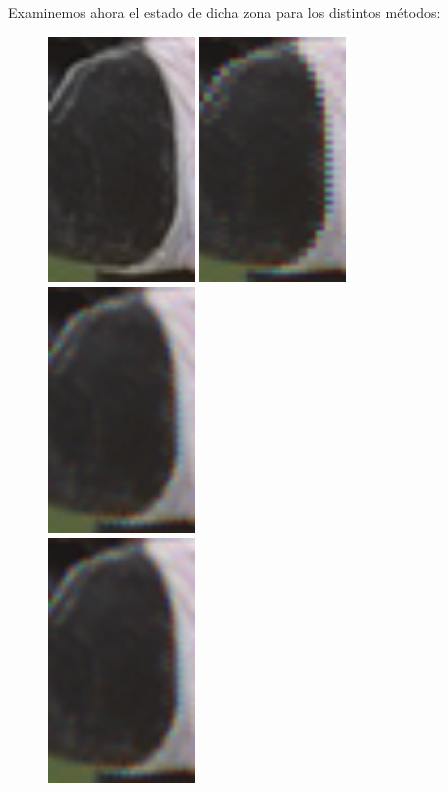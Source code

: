 \documentclass[a4paper]{article}
\begin{document}
Examinemos ahora el estado de dicha zona para los distintos métodos:\\
\begin{figure}[h!]
\centering

\includegraphics[width=110pt]{img/img1-recortada.png}
\includegraphics[width=110pt]{img/img1-0-recortada.png}
\includegraphics[width=110pt]{img/img1-1-recortada.png}\\
\includegraphics[width=110pt]{img/img1-2-recortada.png}

\end{figure}
\end{document}
